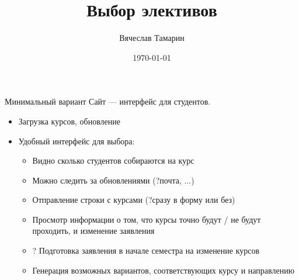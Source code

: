 \documentclass[10pts]{beamer}
\title[choosing-electives]{Выбор элективов}
\begin{document}
\author[Вячеслав Тамарин]{
	\begin{tabular}{c} 
	Вячеслав Тамарин\\
\end{tabular}
}


\date{\today}

\begin{frame} 
    \maketitle 
\end{frame}

\begin{frame}{Минимальный вариант}
Сайт --- интерфейс для студентов.
	\begin{itemize}
	    \item Загрузка курсов, обновление 
	    \item Удобный интерфейс для выбора:
	    \begin{itemize}
	        \item Видно сколько студентов собираются на курс
	        \item Можно следить за обновлениями (?почта, ...)
	        \item Отправление строки с курсами (?сразу в форму или без)
	        \item Просмотр информации о том, что курсы точно будут / не будут проходить, и изменение заявления
	        \item ? Подготовка заявления в начале семестра на изменение курсов
	        \item Генерация возможных вариантов, соответствующих курсу и направлению
	    \end{itemize}
	\end{itemize}
\end{frame}
\end{document}
